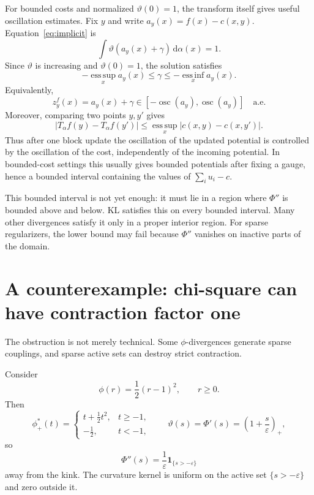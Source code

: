 \documentclass[11pt]{article}
\newcommand{\eps}{\varepsilon}
\newcommand{\dd}{\,\mathrm{d}}
\newcommand{\osc}{\operatorname{osc}}
\newcommand{\one}{\mathbf{1}}
\newcommand{\esssup}{\operatorname*{ess\,sup}}
\newcommand{\essinf}{\operatorname*{ess\,inf}}
\begin{document}
For bounded costs and normalized $\vartheta(0)=1$, the transform itself gives
useful oscillation estimates.  Fix $y$ and write
$a_y(x)=f(x)-c(x,y)$.  Equation~\eqref{eq:implicit} is
\begin{equation*}
  \int \vartheta(a_y(x)+\gamma)\dd\alpha(x)=1.
\end{equation*}
Since $\vartheta$ is increasing and $\vartheta(0)=1$, the solution satisfies
\begin{equation}\label{eq:gamma-range}
  -\esssup_x a_y(x)
  \leq \gamma
  \leq
  -\essinf_x a_y(x).
\end{equation}
Equivalently,
\begin{equation}\label{eq:zrange}
  z_y^f(x)=a_y(x)+\gamma
  \in
  [-\osc(a_y),\osc(a_y)]
  \quad \text{a.e.}
\end{equation}
Moreover, comparing two points $y,y'$ gives
\begin{equation}\label{eq:Lip-cost}
  |T_\alpha f(y)-T_\alpha f(y')|
  \leq
  \esssup_x |c(x,y)-c(x,y')|.
\end{equation}
Thus after one block update the oscillation of the updated potential is
controlled by the oscillation of the cost, independently of the incoming
potential.  In bounded-cost settings this usually gives bounded potentials
after fixing a gauge, hence a bounded interval containing the values of
$\sum_i u_i-c$.

This bounded interval is not yet enough: it must lie in a region where
$\Phi''$ is bounded above and below.  KL satisfies this on every bounded
interval.  Many other divergences satisfy it only in a proper interior region.
For sparse regularizers, the lower bound may fail because $\Phi''$ vanishes on
inactive parts of the domain.

\section{A counterexample: chi-square can have contraction factor one}\label{sec:counterexample}

The obstruction is not merely technical.  Some $\phi$-divergences generate
sparse couplings, and sparse active sets can destroy strict contraction.

Consider
\begin{equation*}
  \phi(r)=\frac12(r-1)^2,
  \qquad r\geq 0.
\end{equation*}
Then
\begin{equation*}
  \phi_+^*(t)=
  \begin{cases}
  t+\frac12t^2, & t\geq -1,\\
  -\frac12, & t<-1,
  \end{cases}
  \qquad
  \vartheta(s)=\Phi'(s)=\left(1+\frac{s}{\eps}\right)_+,
\end{equation*}
so
\begin{equation*}
  \Phi''(s)=\frac1\eps\one_{\{s>-\eps\}}
\end{equation*}
away from the kink.  The curvature kernel is uniform on the active set
$\{s>-\eps\}$ and zero outside it.
\end{document}
